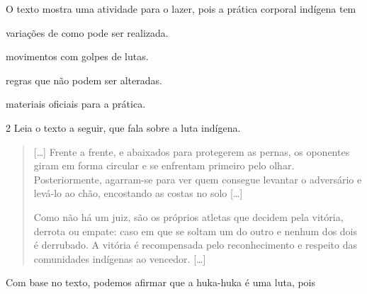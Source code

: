\noindent{}O texto mostra uma atividade para o lazer, pois a prática corporal indígena tem

\begin{minipage}{.5\textwidth}
\begin{escolha}
\item variações de como pode ser realizada.

\item movimentos com golpes de lutas.

\item regras que não podem ser alteradas.

\item materiais oficiais para a prática.
\end{escolha}
\end{minipage}


\num{2} Leia o texto a seguir, que fala sobre a luta indígena.

\begin{quote}

{[}\ldots{}{]} Frente a frente, e abaixados para protegerem as pernas, os oponentes
giram em forma circular e se enfrentam primeiro pelo olhar.
Posteriormente, agarram-se para ver quem consegue levantar o adversário
e levá-lo ao chão, encostando as costas no solo {[}\ldots{}{]}

Como não há um juiz, são os próprios atletas que decidem pela vitória,
derrota ou empate: caso em que se soltam um do outro e nenhum dos dois é
derrubado. A vitória é recompensada pelo reconhecimento e respeito das
comunidades indígenas ao vencedor. {[}\ldots{}{]}

\end{quote}

\noindent{}Com base no texto, podemos afirmar que a huka-huka é uma luta, pois

